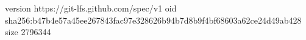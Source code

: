 version https://git-lfs.github.com/spec/v1
oid sha256:b47b4e57a45ee267843fac97e328626b94b7d8b9f4bf68603a62ce24d49ab428
size 2796344
